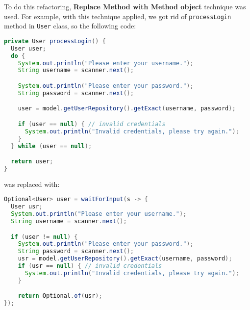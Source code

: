\documentclass{article}
\renewcommand{\b}[1]{\textbf{#1}}
\newcommand{\code}[1]{\texttt{#1}}
\begin{document}
To do this refactoring, \b{Replace Method with Method object} technique was used. For example, with this technique applied, we got rid of \code{processLogin} method in \code{User} class, so the following code:

\begin{lstlisting}[language=Java]
private User processLogin() {
  User user;
  do {
    System.out.println("Please enter your username.");
    String username = scanner.next();

    System.out.println("Please enter your password.");
    String password = scanner.next();

    user = model.getUserRepository().getExact(username, password);

    if (user == null) { // invalid credentials
      System.out.println("Invalid credentials, please try again.");
    }
  } while (user == null);

  return user;
}
\end{lstlisting}

\noindent was replaced with:
\begin{lstlisting}[language=Java]
Optional<User> user = waitForInput(s -> {
  User usr;
  System.out.println("Please enter your username.");
  String username = scanner.next();

  if (user != null) {
    System.out.println("Please enter your password.");
    String password = scanner.next();
    usr = model.getUserRepository().getExact(username, password);
    if (usr == null) { // invalid credentials
      System.out.println("Invalid credentials, please try again.");
    }

    return Optional.of(usr);
});
\end{lstlisting}
\end{document}
